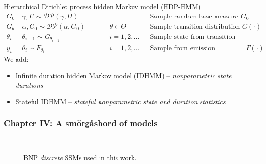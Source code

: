 \documentclass[aspectratio=169]{beamer}
\begin{document}
\begin{frame}
    Hierarchical Dirichlet process hidden Markov model (HDP-HMM) 
    \begin{align*}
        G_0&\mid \gamma, H \sim \mathcal{DP}(\gamma,H)&&  && \textrm{Sample random base measure }G_0\\
        G_\theta&\mid \alpha,G_0 \sim \mathcal{DP}(\alpha,G_0) &&\qquad \theta\in\Theta && \textrm{Sample transition distribution } G(\cdot)\\
        \theta_{i}&\mid \theta_{i-1}  \sim G_{\theta_{i-1}} &&\qquad i=1,2,\ldots && \textrm{Sample state from transition distribution}\\
        y_i&\mid \theta_i \sim F_{\theta_i} &&\qquad i=1,2,\ldots && \textrm{Sample from emission distribution }F(\cdot)
    \end{align*}
    We add:
    \begin{itemize}
        \item Infinite duration hidden Markov model (IDHMM) -- \emph{nonparametric state durations}
        \item Stateful IDHMM -- \emph{stateful nonparametric state and duration statistics} 
    \end{itemize}
\end{frame}





\begin{frame}
    \frametitle{Chapter IV: A sm\"{o}rg\aa sbord of models}

    \vspace{-1em}
    \begin{figure}[ht!]
        \hfill
        \hfill
        \\
        \hspace{2em}
        \caption{BNP \emph{discrete} SSMs used in this work.}
    \end{figure}
\end{frame}
\end{document}
